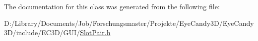 The documentation for this class was generated from the following file\+:\begin{DoxyCompactItemize}
\item 
D\+:/\+Library/\+Documents/\+Job/\+Forschungsmaster/\+Projekte/\+Eye\+Candy3\+D/\+Eye\+Candy3\+D/include/\+E\+C3\+D/\+G\+U\+I/\mbox{\hyperlink{_slot_pair_8h}{Slot\+Pair.\+h}}\end{DoxyCompactItemize}
